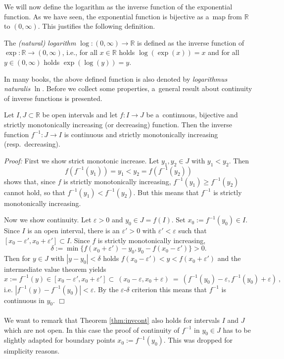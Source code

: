 

We will now define the logarithm as the inverse function of the exponential function. As we have seen, the exponential function is bijective as a~map from $\mathbb{R}$ to $(0,\infty)$. This justifies the following definition.
\begin{Definition}{}
 The \emph{(natural) logarithm} $\log:(0,\infty)\to\mathbb{R}$ is defined as the inverse function of $\exp:\mathbb{R}\to(0,\infty)$, i.e., for all $x\in\mathbb{R}$ holds $\log(\exp(x))=x$ and for all $y \in (0,\infty)$ holds $\exp(\log(y)) = y$.
\end{Definition}
In many books, the above defined function is also denoted by {\em logarithmus naturalis} $\ln$. Before we collect some properties, a~general result about continuity of inverse functions is presented.


\begin{Theorem}\label{thm:invcont}
Let $I,J\subset\mathbb{R}$ be open intervals and let $f:I\to J$ be a~continuous, bijective and strictly monotonically increasing (or decreasing) function. 
Then the inverse function $f^{-1}:J\to I$ is continuous and strictly monotonically increasing (resp.\ decreasing).
\end{Theorem}
{\em Proof:} 
First we show strict monotonic increase. Let $y_1,y_2\in J$ with $y_1< y_2$. Then
  \[f(f^{-1}(y_1))=y_1 < y_2 = f(f^{-1}(y_2))\]
  shows that, since $f$ is strictly monotonically increasing, $f^{-1}(y_1)\geq f^{-1}(y_2)$ cannot hold, so that $f^{-1}(y_1) < f^{-1}(y_2)$.
  But this means that $f^{-1}$ is strictly monotonically increasing.

Now we show continuity. 
Let $\varepsilon>0$ and $y_0\in J=f(I)$. Set $x_0:=f^{-1}(y_0)\in I$. Since $I$ is an open interval, there is  
an $\varepsilon'>0$ with $\varepsilon'<\varepsilon$ such that $[x_0-\varepsilon',x_0+\varepsilon']\subset I$. 
Since $f$ is strictly monotonically increasing, $$\delta:=\min\{f(x_0+\varepsilon')-y_0,y_0-f(x_0-\varepsilon')\}>0.$$
Then for $y\in J$ with $|y-y_0|<\delta$ holds $f(x_0-\varepsilon')< y< f(x_0+\varepsilon')$ and the intermediate value theorem 
yields $$x:=f^{-1}(y) \in [x_0-\varepsilon',x_0+\varepsilon'] \subset ~ (x_0-\varepsilon,x_0+\varepsilon) ~ = ~ (f^{-1}(y_0)-\varepsilon,f^{-1}(y_0)+\varepsilon)\ ,$$
i.e. $|f^{-1}(y)-f^{-1}(y_0)|<\varepsilon$. By the $\varepsilon$-$\delta$  criterion this means that $f^{-1}$ is continuous in $y_0$. 
\hfill$\Box$
\\ \\
We want to remark that Theorem \ref{thm:invcont} also holds for intervals $I$ and $J$ which are not open. 
In this case the proof of continuity of $f^{-1}$ in $y_0\in J$ has to be slightly adapted for boundary points $x_0:=f^{-1}(y_0)$. 
This was dropped for simplicity reasons. 
  

